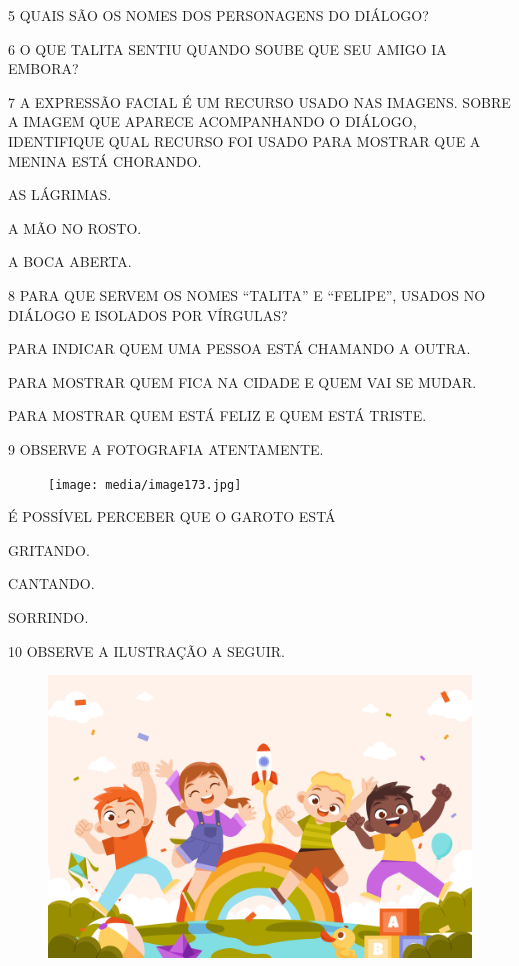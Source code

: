 \num{5} QUAIS SÃO OS NOMES DOS PERSONAGENS DO DIÁLOGO?


\num{6} O QUE TALITA SENTIU QUANDO SOUBE QUE SEU AMIGO IA EMBORA?


\num{7} A EXPRESSÃO FACIAL É UM RECURSO USADO NAS 
IMAGENS. SOBRE A IMAGEM QUE APARECE ACOMPANHANDO 
O DIÁLOGO, IDENTIFIQUE QUAL RECURSO FOI USADO PARA MOSTRAR QUE A MENINA ESTÁ CHORANDO.

\begin{boxlist}[itemsep=1pt]
 AS LÁGRIMAS.

 A MÃO NO ROSTO.

 A BOCA ABERTA.
\end{boxlist}

\num{8} PARA QUE SERVEM OS NOMES ``TALITA'' E ``FELIPE'', USADOS NO DIÁLOGO E ISOLADOS POR VÍRGULAS?

\begin{boxlist}[itemsep=1pt]
 PARA INDICAR QUEM UMA PESSOA ESTÁ CHAMANDO A OUTRA.

 PARA MOSTRAR QUEM FICA NA CIDADE E QUEM VAI SE MUDAR.

 PARA MOSTRAR QUEM ESTÁ FELIZ E QUEM ESTÁ TRISTE.
\end{boxlist}

\pagebreak
\num{9} OBSERVE A FOTOGRAFIA ATENTAMENTE.

\begin{figure}[H]
\centering
\texttt{[image: media/image173.jpg]}
\end{figure}

É POSSÍVEL PERCEBER QUE O GAROTO ESTÁ

\begin{multicols}{3}
\begin{boxlist}
 GRITANDO. 

 CANTANDO.

 SORRINDO.
\end{boxlist}
\end{multicols}

\num{10} OBSERVE A ILUSTRAÇÃO A SEGUIR.

\begin{figure}[H]
\centering
\includegraphics[width=.8\textwidth]{media/image174.jpg}
\end{figure}

